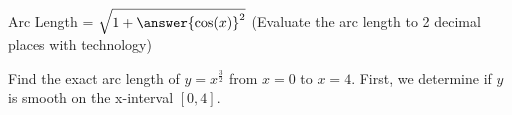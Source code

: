 \documentclass{ximera}
\begin{document}
\begin{problem}

Arc Length = $\sqrt{1+{\answer{\cos(x)}^2}}$ (Evaluate the arc length to 2 decimal places with technology)

\end{problem}

\begin{problem}

Find the exact arc length of $y = x^{\frac{3}{2}}$ from $x=0$ to $x=4$.  First, we determine if $y$ is smooth on the x-interval $[0,4]$.  


\end{problem}
\end{document}
